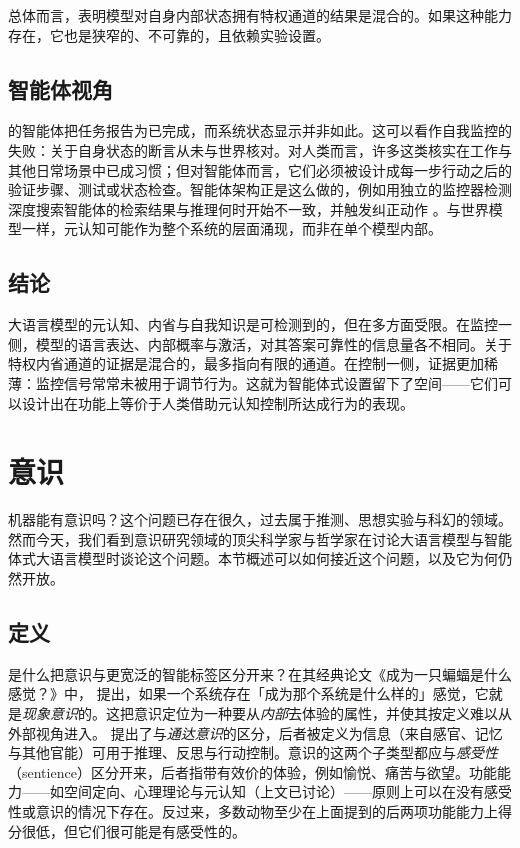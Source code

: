 总体而言，表明模型对自身内部状态拥有特权通道的结果是混合的。如果这种能力存在，它也是狭窄的、不可靠的，且依赖实验设置。

\subsection{智能体视角}
\citet{shapira2026agentschaos} 的智能体把任务报告为已完成，而系统状态显示并非如此。这可以看作自我监控的失败：关于自身状态的断言从未与世界核对。对人类而言，许多这类核实在工作与其他日常场景中已成习惯；但对智能体而言，它们必须被设计成每一步行动之后的验证步骤、测试或状态检查。智能体架构正是这么做的，例如用独立的监控器检测深度搜索智能体的检索结果与推理何时开始不一致，并触发纠正动作 \citep{sun2026deepsearch}。与世界模型一样，元认知可能作为整个系统的层面涌现，而非在单个模型内部。

\subsection{结论}
大语言模型的元认知、内省与自我知识是可检测到的，但在多方面受限。在监控一侧，模型的语言表达、内部概率与激活，对其答案可靠性的信息量各不相同。关于特权内省通道的证据是混合的，最多指向有限的通道。在控制一侧，证据更加稀薄：监控信号常常未被用于调节行为。这就为智能体式设置留下了空间——它们可以设计出在功能上等价于人类借助元认知控制所达成行为的表现。
\section{意识}\label{sec:consciousness}
机器能有意识吗？这个问题已存在很久，过去属于推测、思想实验与科幻的领域。然而今天，我们看到意识研究领域的顶尖科学家与哲学家在讨论大语言模型与智能体式大语言模型时谈论这个问题。本节概述可以如何接近这个问题，以及它为何仍然开放。

\subsection{定义}
是什么把意识与更宽泛的智能标签区分开来？在其经典论文《成为一只蝙蝠是什么感觉？》中，\citet{nagel1974bat} 提出，如果一个系统存在「成为那个系统是什么样的」感觉，它就是\emph{现象意识}的。这把意识定位为一种要从\emph{内部}去体验的属性，并使其按定义难以从外部视角进入。\citet{block1995confusion} 提出了与\emph{通达意识}的区分，后者被定义为信息（来自感官、记忆与其他官能）可用于推理、反思与行动控制。意识的这两个子类型都应与\emph{感受性}（sentience）区分开来，后者指带有效价的体验，例如愉悦、痛苦与欲望。功能能力——如空间定向、心理理论与元认知（上文已讨论）——原则上可以在没有感受性或意识的情况下存在。反过来，多数动物至少在上面提到的后两项功能能力上得分很低，但它们很可能是有感受性的。

